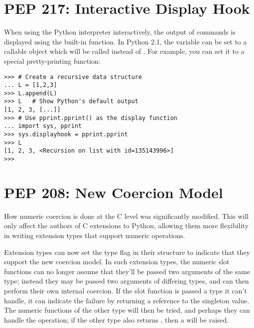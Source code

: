 \documentclass{howto}
\begin{document}
\section{PEP 217: Interactive Display Hook}

When using the Python interpreter interactively, the output of
commands is displayed using the built-in  function.
In Python 2.1, the variable  can be set to a
callable object which will be called instead of .
For example, you can set it to a special pretty-printing function:

\begin{verbatim}
>>> # Create a recursive data structure
... L = [1,2,3]
>>> L.append(L)
>>> L   # Show Python's default output
[1, 2, 3, [...]]
>>> # Use pprint.pprint() as the display function
... import sys, pprint
>>> sys.displayhook = pprint.pprint
>>> L
[1, 2, 3, <Recursion on list with id=135143996>]
>>> 
\end{verbatim}

\begin{seealso}


\end{seealso}

\section{PEP 208: New Coercion Model}

How numeric coercion is done at the C level was significantly
modified.  This will only affect the authors of C extensions to
Python, allowing them more flexibility in writing extension types that
support numeric operations.

Extension types can now set the type flag
 in their 
structure to indicate that they support the new coercion model.  In
such extension types, the numeric slot functions can no longer assume
that they'll be passed two arguments of the same type; instead they
may be passed two arguments of differing types, and can then perform
their own internal coercion.  If the slot function is passed a type it
can't handle, it can indicate the failure by returning a reference to
the  singleton value.  The numeric functions
of the other type will then be tried, and perhaps they can handle the
operation; if the other type also returns ,
then a  will be raised.
\end{document}
